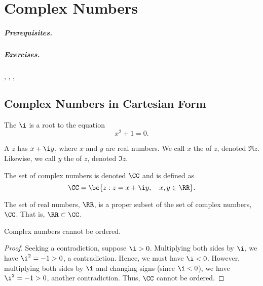 \chapter{Complex Numbers}

\paragraph{Prerequisites.} 
\paragraph{Exercises.} , , , 

\section{Complex Numbers in Cartesian Form}

\begin{definition}
    The  $\i$ is a root to the equation \[x^2 + 1 = 0.\]
\end{definition}

\begin{definition}
    A  $z$ has  $x + \i y$, where $x$ and $y$ are real numbers. We call $x$ the  of $z$, denoted $\Re z$. Likewise, we call $y$ the  of $z$, denoted $\Im z$.
\end{definition}

\begin{definition}
    The set of complex numbers is denoted $\CC$ and is defined as \[\CC = \bc{z : z = x + \i y , \quad x, y \in \RR}.\]
\end{definition}
\begin{remark}
    The set of real numbers, $\RR$, is a proper subset of the set of complex numbers, $\CC$. That is, $\RR \subset \CC$.
\end{remark}

\begin{proposition}
    Complex numbers cannot be ordered.
\end{proposition}
\begin{proof}
    Seeking a contradiction, suppose $\i > 0$. Multiplying both sides by $\i$, we have $\i^2 = -1 > 0$, a contradiction. Hence, we must have $\i < 0$. However, multiplying both sides by $\i$ and changing signs (since $\i < 0$), we have $\i^2 = -1 > 0$, another contradiction. Thus, $\CC$ cannot be ordered.
\end{proof}

